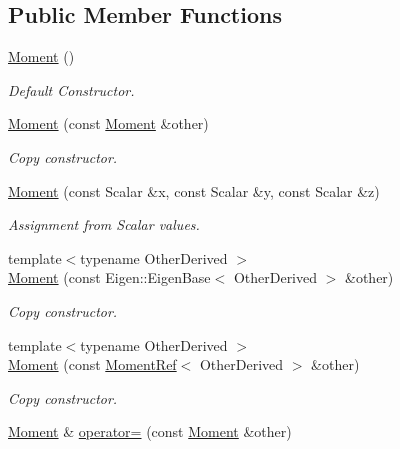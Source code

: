 \subsection*{Public Member Functions}
\begin{DoxyCompactItemize}
\item 
\hyperlink{classow__core_1_1Moment_ac0c0aa2da1fa194df0c4e32792f9bdb4}{Moment} ()\hypertarget{classow__core_1_1Moment_ac0c0aa2da1fa194df0c4e32792f9bdb4}{}\label{classow__core_1_1Moment_ac0c0aa2da1fa194df0c4e32792f9bdb4}

\begin{DoxyCompactList}\small\item\em Default Constructor. \end{DoxyCompactList}\item 
\hyperlink{classow__core_1_1Moment_a0a5eb3bed6abfc2bfa3196ec5c1bef3f}{Moment} (const \hyperlink{classow__core_1_1Moment}{Moment} \&other)\hypertarget{classow__core_1_1Moment_a0a5eb3bed6abfc2bfa3196ec5c1bef3f}{}\label{classow__core_1_1Moment_a0a5eb3bed6abfc2bfa3196ec5c1bef3f}

\begin{DoxyCompactList}\small\item\em Copy constructor. \end{DoxyCompactList}\item 
\hyperlink{classow__core_1_1Moment_a9c400630f5cd1bae41a68a4692138b96}{Moment} (const Scalar \&x, const Scalar \&y, const Scalar \&z)\hypertarget{classow__core_1_1Moment_a9c400630f5cd1bae41a68a4692138b96}{}\label{classow__core_1_1Moment_a9c400630f5cd1bae41a68a4692138b96}

\begin{DoxyCompactList}\small\item\em Assignment from Scalar values. \end{DoxyCompactList}\item 
{\footnotesize template$<$typename Other\+Derived $>$ }\\\hyperlink{classow__core_1_1Moment_a4e0a0f99a22ef5423718aae4db3b4935}{Moment} (const Eigen\+::\+Eigen\+Base$<$ Other\+Derived $>$ \&other)
\begin{DoxyCompactList}\small\item\em Copy constructor. \end{DoxyCompactList}\item 
{\footnotesize template$<$typename Other\+Derived $>$ }\\\hyperlink{classow__core_1_1Moment_aee9358f5de30a8ebaa84d36e69350029}{Moment} (const \hyperlink{classow__core_1_1MomentRef}{Moment\+Ref}$<$ Other\+Derived $>$ \&other)
\begin{DoxyCompactList}\small\item\em Copy constructor. \end{DoxyCompactList}\item 
\hyperlink{classow__core_1_1Moment}{Moment} \& \hyperlink{classow__core_1_1Moment_ac4693c9cf7722073dc3d3157ed18e895}{operator=} (const \hyperlink{classow__core_1_1Moment}{Moment} \&other)\hypertarget{classow__core_1_1Moment_ac4693c9cf7722073dc3d3157ed18e895}{}\label{classow__core_1_1Moment_ac4693c9cf7722073dc3d3157ed18e895}


\end{DoxyCompactItemize}
